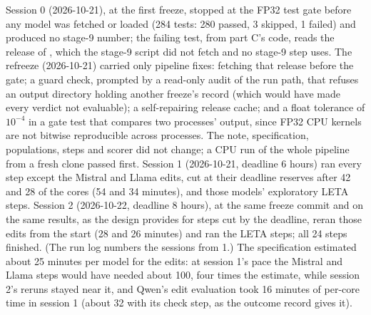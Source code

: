 Session 0 (2026-10-21), at the first freeze, stopped at the FP32 test gate before any model was fetched or loaded (284 tests: 280 passed, 3 skipped, 1 failed) and produced no stage-9 number; the failing test, from part C's code, reads the release of \citet{prakash2025lookbacks}, which the stage-9 script did not fetch and no stage-9 step uses. The refreeze (2026-10-21) carried only pipeline fixes: fetching that release before the gate; a guard check, prompted by a read-only audit of the run path, that refuses an output directory holding another freeze's record (which would have made every verdict not evaluable); a self-repairing release cache; and a float tolerance of $10^{-4}$ in a gate test that compares two processes' output, since FP32 CPU kernels are not bitwise reproducible across processes. The note, specification, populations, steps and scorer did not change; a CPU run of the whole pipeline from a fresh clone passed first. Session 1 (2026-10-21, deadline 6 hours) ran every step except the Mistral and Llama edits, cut at their deadline reserves after 42 and 28 of the \NqCores{} cores (54 and 34 minutes), and those models' exploratory LETA steps. Session 2 (2026-10-22, deadline 8 hours), at the same freeze commit and on the same results, as the design provides for steps cut by the deadline, reran those edits from the start (28 and 26 minutes) and ran the LETA steps; all 24 steps finished. (The run log numbers the sessions from 1.) The specification estimated about 25 minutes per model for the edits: at session 1's pace the Mistral and Llama steps would have needed about 100, four times the estimate, while session 2's reruns stayed near it, and Qwen's edit evaluation took 16 minutes of per-core time in session 1 (about 32 with its check step, as the outcome record gives it). %

